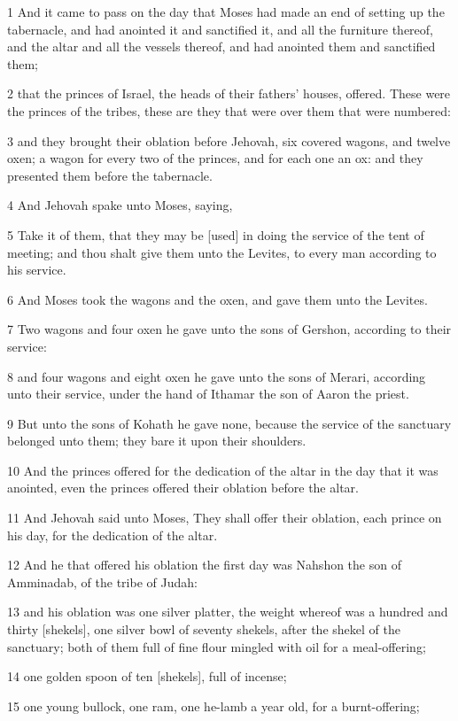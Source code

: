 \par 1 And it came to pass on the day that Moses had made an end of setting up the tabernacle, and had anointed it and sanctified it, and all the furniture thereof, and the altar and all the vessels thereof, and had anointed them and sanctified them;
\par 2 that the princes of Israel, the heads of their fathers' houses, offered. These were the princes of the tribes, these are they that were over them that were numbered:
\par 3 and they brought their oblation before Jehovah, six covered wagons, and twelve oxen; a wagon for every two of the princes, and for each one an ox: and they presented them before the tabernacle.
\par 4 And Jehovah spake unto Moses, saying,
\par 5 Take it of them, that they may be [used] in doing the service of the tent of meeting; and thou shalt give them unto the Levites, to every man according to his service.
\par 6 And Moses took the wagons and the oxen, and gave them unto the Levites.
\par 7 Two wagons and four oxen he gave unto the sons of Gershon, according to their service:
\par 8 and four wagons and eight oxen he gave unto the sons of Merari, according unto their service, under the hand of Ithamar the son of Aaron the priest.
\par 9 But unto the sons of Kohath he gave none, because the service of the sanctuary belonged unto them; they bare it upon their shoulders.
\par 10 And the princes offered for the dedication of the altar in the day that it was anointed, even the princes offered their oblation before the altar.
\par 11 And Jehovah said unto Moses, They shall offer their oblation, each prince on his day, for the dedication of the altar.
\par 12 And he that offered his oblation the first day was Nahshon the son of Amminadab, of the tribe of Judah:
\par 13 and his oblation was one silver platter, the weight whereof was a hundred and thirty [shekels], one silver bowl of seventy shekels, after the shekel of the sanctuary; both of them full of fine flour mingled with oil for a meal-offering;
\par 14 one golden spoon of ten [shekels], full of incense;
\par 15 one young bullock, one ram, one he-lamb a year old, for a burnt-offering;

